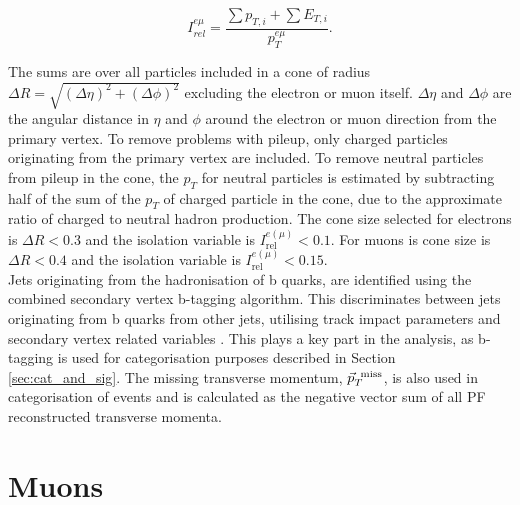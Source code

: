 \begin{equation}
    I_{rel}^{e\mu} = \frac{\sum p_{T,i} + \sum E_{T,i}}{p_T^{e\mu}}.
\end{equation}

The sums are over all particles included in a cone of radius \(\Delta R = \sqrt{(\Delta \eta)^2 + (\Delta \phi)^2}\) excluding the electron or muon itself. \(\Delta \eta\) and \(\Delta \phi\) are the angular distance in \(\eta\) and \(\phi\) around the electron or muon direction from the primary vertex. To remove problems with pileup, only charged particles originating from the primary vertex are included. To remove neutral particles from pileup in the cone, the \(p_T\) for neutral particles is estimated by subtracting half of the sum of the \(p_T\) of charged particle in the cone, due to the approximate ratio of charged to neutral hadron production. The cone size selected for electrons is \(\Delta R<0.3\) and the isolation variable is \(I_{\text{rel}}^{e(\mu)} < 0.1\). For muons is cone size is \(\Delta R<0.4\) and the isolation variable is \(I_{\text{rel}}^{e(\mu)} < 0.15\). \\

Jets originating from the hadronisation of b quarks, are identified using the combined secondary vertex b-tagging algorithm. This discriminates between jets originating from b quarks from other jets, utilising track impact parameters and secondary vertex related variables \cite{CMS_btag}. This plays a key part in the analysis, as b-tagging is used for categorisation purposes described in Section \ref{sec:cat_and_sig}. The missing transverse momentum, \(\vec{p}_T^{\hspace{1ex}\text{miss}}\), is also used in categorisation of events and is calculated as the negative vector sum of all PF reconstructed transverse momenta.

\section{Muons}

